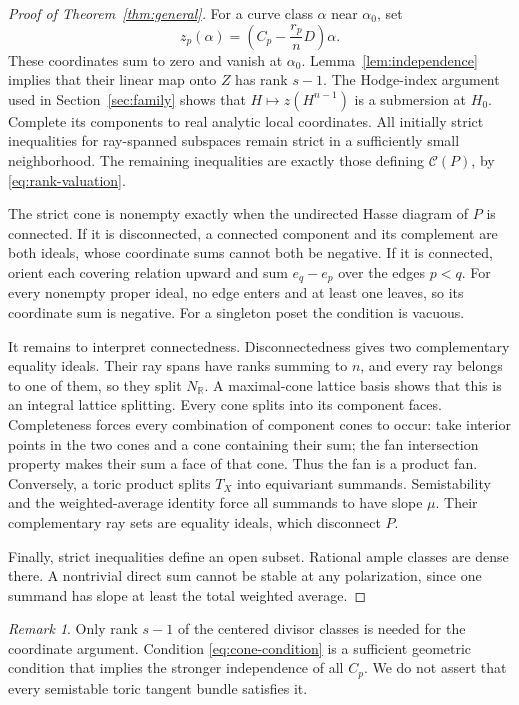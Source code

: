 \documentclass[11pt]{amsart}
\theoremstyle{definition}
\theoremstyle{remark}
\newtheorem{remark}[theorem]{Remark}
\newcommand{\RR}{\mathbb R}
\begin{document}
\begin{proof}[Proof of Theorem~\ref{thm:general}]
For a curve class $\alpha$ near $\alpha_0$, set
\[
 z_p(\alpha)=\left(C_p-\frac{r_p}{n}D\right)\alpha.
\]
These coordinates sum to zero and vanish at $\alpha_0$.
Lemma~\ref{lem:independence} implies that their linear map onto $Z$
has rank $s-1$. The Hodge-index argument used in
Section~\ref{sec:family} shows that $H\mapsto z(H^{n-1})$ is a
submersion at $H_0$. Complete its components to real analytic local
coordinates. All initially strict inequalities for ray-spanned subspaces remain strict
in a sufficiently small neighborhood. The remaining inequalities are
exactly those defining $\mathcal C(P)$, by
\eqref{eq:rank-valuation}.

The strict cone is nonempty exactly when the undirected Hasse diagram
of $P$ is connected. If it is disconnected, a connected component and
its complement are both ideals, whose coordinate sums cannot both be
negative. If it is connected, orient each covering relation upward
and sum $e_q-e_p$ over the edges $p<q$. For every nonempty proper
ideal, no edge enters and at least one leaves, so its coordinate sum
is negative. For a singleton poset the condition is vacuous.

It remains to interpret connectedness. Disconnectedness gives two
complementary equality ideals. Their ray spans have ranks summing to
$n$, and every ray belongs to one of them, so they split $N_\RR$.
A maximal-cone lattice basis shows that this is an integral lattice
splitting. Every cone splits into its component faces. Completeness
forces every combination of component cones to occur: take interior
points in the two cones and a cone containing their sum; the fan
intersection property makes their sum a face of that cone.
Thus the fan is a product fan. Conversely, a toric product splits
$T_X$ into equivariant summands. Semistability and the weighted-average
identity force all summands to have slope $\mu$. Their complementary
ray sets are equality ideals, which disconnect $P$.

Finally, strict inequalities define an open subset. Rational ample
classes are dense there. A nontrivial direct sum cannot be stable at
any polarization, since one summand has slope at least the total
weighted average.
\end{proof}

\begin{remark}
Only rank $s-1$ of the centered divisor classes is needed for the
coordinate argument. Condition \eqref{eq:cone-condition} is a sufficient
geometric condition that implies the stronger independence of all
$C_p$. We do not assert that every semistable toric tangent bundle
satisfies it.
\end{remark}
\end{document}
